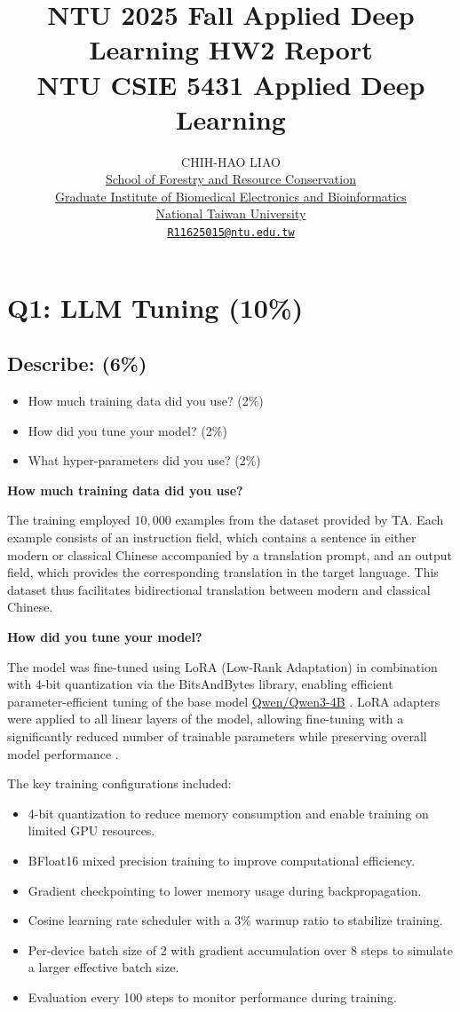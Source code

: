 \documentclass{article}
\title{
  NTU 2025 Fall Applied Deep Learning HW2 Report \\
  \vspace{1em}
  \small{\normalfont NTU CSIE 5431 Applied Deep Learning}
}
\author{
  CHIH-HAO LIAO \\
  {\hypersetup{urlcolor=black}\href{https://www.fo.ntu.edu.tw/}{School of Forestry and Resource Conservation}}\\
  {\hypersetup{urlcolor=black}\href{https://www.bebi.ntu.edu.tw/}{Graduate Institute of Biomedical Electronics and Bioinformatics}}\\
  {\hypersetup{urlcolor=black}\href{https://www.ntu.edu.tw/}{National Taiwan University}}\\
  {\hypersetup{urlcolor=black}\href{mailto:R11625015@ntu.edu.tw}{\texttt{R11625015@ntu.edu.tw}}} \\
}
\begin{document}
\maketitle

\section{Q1: LLM Tuning (10\%)}
\subsection{Describe: (6\%)}
\begin{itemize}
    \item How much training data did you use? (2\%)
    \item How did you tune your model? (2\%)
    \item What hyper-parameters did you use? (2\%)
\end{itemize}

\textbf{How much training data did you use?}

The training employed $10,000$ examples from the dataset provided by TA. Each example consists of an instruction field, which contains a sentence in either modern or classical Chinese accompanied by a translation prompt, and an output field, which provides the corresponding translation in the target language. This dataset thus facilitates bidirectional translation between modern and classical Chinese.

\textbf{How did you tune your model?}

The model was fine-tuned using LoRA (Low-Rank Adaptation) \citep{hu2022lora} in combination with 4-bit quantization via the BitsAndBytes library, enabling efficient parameter-efficient tuning of the base model \href{https://huggingface.co/Qwen/Qwen3-4B}{Qwen/Qwen3-4B} \citep{qwen3technicalreport}. LoRA adapters were applied to all linear layers of the model, allowing fine-tuning with a significantly reduced number of trainable parameters while preserving overall model performance \citep{dettmers2023qlora}.

The key training configurations included:

\begin{itemize}
    \item 4-bit quantization to reduce memory consumption and enable training on limited GPU resources.
    \item BFloat16 mixed precision training to improve computational efficiency.
    \item Gradient checkpointing to lower memory usage during backpropagation.
    \item Cosine learning rate scheduler with a 3\% warmup ratio to stabilize training.
    \item Per-device batch size of 2 with gradient accumulation over 8 steps to simulate a larger effective batch size.
    \item Evaluation every 100 steps to monitor performance during training.
\end{itemize}
\end{document}
